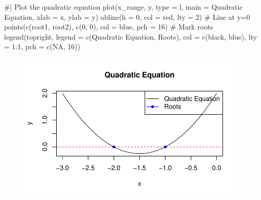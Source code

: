 \documentclass[
  letterpaper,
  DIV=11,
  numbers=noendperiod]{scrartcl}
\newenvironment{Shaded}{\begin{snugshade}}{\end{snugshade}}
\newcommand{\AttributeTok}[1]{\textcolor[rgb]{0.40,0.45,0.13}{#1}}
\newcommand{\CommentTok}[1]{\textcolor[rgb]{0.37,0.37,0.37}{#1}}
\newcommand{\ConstantTok}[1]{\textcolor[rgb]{0.56,0.35,0.01}{#1}}
\newcommand{\DecValTok}[1]{\textcolor[rgb]{0.68,0.00,0.00}{#1}}
\newcommand{\FunctionTok}[1]{\textcolor[rgb]{0.28,0.35,0.67}{#1}}
\newcommand{\NormalTok}[1]{\textcolor[rgb]{0.00,0.23,0.31}{#1}}
\newcommand{\SpecialCharTok}[1]{\textcolor[rgb]{0.37,0.37,0.37}{#1}}
\newcommand{\StringTok}[1]{\textcolor[rgb]{0.13,0.47,0.30}{#1}}
\begin{document}
\begin{Shaded}
\begin{Highlighting}[]
\CommentTok{\#| Plot the quadratic equation}
\FunctionTok{plot}\NormalTok{(x\_range, y, }\AttributeTok{type =} \StringTok{\textquotesingle{}l\textquotesingle{}}\NormalTok{, }\AttributeTok{main =} \StringTok{\textquotesingle{}Quadratic Equation\textquotesingle{}}\NormalTok{, }\AttributeTok{xlab =} \StringTok{\textquotesingle{}x\textquotesingle{}}\NormalTok{, }\AttributeTok{ylab =} \StringTok{\textquotesingle{}y\textquotesingle{}}\NormalTok{)}
\FunctionTok{abline}\NormalTok{(}\AttributeTok{h =} \DecValTok{0}\NormalTok{, }\AttributeTok{col =} \StringTok{\textquotesingle{}red\textquotesingle{}}\NormalTok{, }\AttributeTok{lty =} \DecValTok{2}\NormalTok{)  }\CommentTok{\# Line at y=0}
\FunctionTok{points}\NormalTok{(}\FunctionTok{c}\NormalTok{(root1, root2), }\FunctionTok{c}\NormalTok{(}\DecValTok{0}\NormalTok{, }\DecValTok{0}\NormalTok{), }\AttributeTok{col =} \StringTok{\textquotesingle{}blue\textquotesingle{}}\NormalTok{, }\AttributeTok{pch =} \DecValTok{16}\NormalTok{)  }\CommentTok{\# Mark roots}
\FunctionTok{legend}\NormalTok{(}\StringTok{\textquotesingle{}topright\textquotesingle{}}\NormalTok{, }\AttributeTok{legend =} \FunctionTok{c}\NormalTok{(}\StringTok{\textquotesingle{}Quadratic Equation\textquotesingle{}}\NormalTok{, }\StringTok{\textquotesingle{}Roots\textquotesingle{}}\NormalTok{), }\AttributeTok{col =} \FunctionTok{c}\NormalTok{(}\StringTok{\textquotesingle{}black\textquotesingle{}}\NormalTok{, }\StringTok{\textquotesingle{}blue\textquotesingle{}}\NormalTok{), }\AttributeTok{lty =} \DecValTok{1}\SpecialCharTok{:}\DecValTok{1}\NormalTok{, }\AttributeTok{pch =} \FunctionTok{c}\NormalTok{(}\ConstantTok{NA}\NormalTok{, }\DecValTok{16}\NormalTok{))}
\end{Highlighting}
\end{Shaded}

\begin{figure}[H]

{\centering \includegraphics{template_files/figure-pdf/unnamed-chunk-4-1.pdf}

}

\end{figure}
\end{document}
